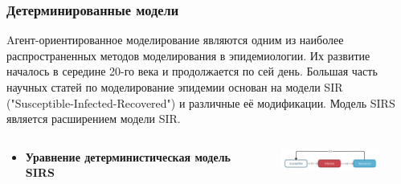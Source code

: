 \documentclass[
    11pt, %
    aspectratio=169, %
]{beamer}
\begin{document}
\begin{frame}
    \frametitle{Детерминированные модели}
    \fontsize{8}{10}\selectfont{}
     
    Aгент-ориентированное моделирование являются одним из наиболее распространенных методов моделирования в эпидемиологии. Их развитие началось в середине 20-го века и продолжается по сей день. Большая часть научных статей по моделирование эпидемии основан на модели SIR ("Susceptible-Infected-Recovered") и различные её модификации. Модель SIRS является расширением модели SIR.
    \medskip

    \begin{columns}[c]
        \begin{column}{0.5\textwidth}
            \begin{itemize}
                \item \textbf{Уравнение детерминистическая модель SIRS}
            \end{itemize}    
        \end{column}

        \begin{column}{0.5\textwidth}
            \begin{figure}
                \centering
                \vspace{-0.6cm}
                \includegraphics[angle=0, width=4cm]{SIRS.png}
            \end{figure}
        \end{column}
    \end{columns}
 

\end{frame}
\end{document}
